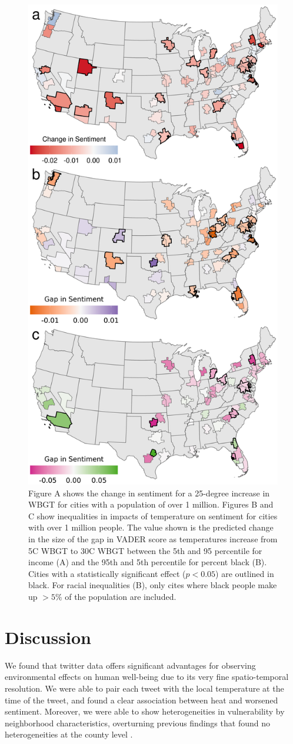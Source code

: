 \documentclass[fleqn,10pt]{wlscirep}
\begin{document}
\begin{figure}[H]
\centering
  \includegraphics[width=0.5\linewidth]{../res/map_combined.png}
  \caption{}
  \label{fig:map}
\caption{Figure A shows the change in sentiment for a 25-degree increase in WBGT for cities with a population of over 1 million.  Figures B and C show inequalities in impacts of temperature on sentiment for cities with over 1 million people.  The value shown is the predicted change in the size of the gap in VADER score as temperatures increase from 5\textdegree C WBGT to 30\textdegree C WBGT between the 5th and 95 percentile for income (A) and the 95th and 5th percentile for percent black (B).  Cities with a statistically significant effect ($p < 0.05$) are outlined in black.  For racial inequalities (B), only cites where black people make up $> 5\%$ of the population are included.}
\end{figure}

\section*{Discussion}
We found that twitter data offers significant advantages for observing environmental effects on human well-being due to its very fine spatio-temporal resolution.  We were able to pair each tweet with the local temperature at the time of the tweet, and found a clear association between heat and worsened sentiment.   Moreover, we were able to show heterogeneities in vulnerability by neighborhood characteristics, overturning previous findings that found no heterogeneities at the county level \cite{Burke2018Aug, Mullins2019Dec}.
\end{document}
